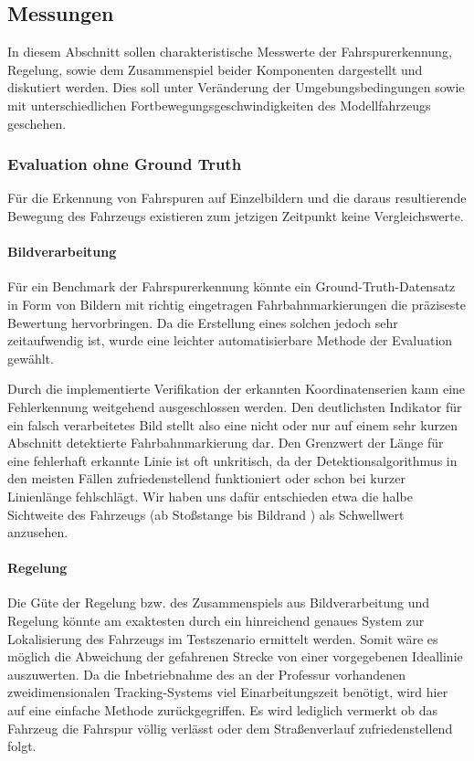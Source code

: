 \subsection{Messungen}
In diesem Abschnitt sollen charakteristische Messwerte der Fahrspurerkennung, Regelung, sowie dem Zusammenspiel beider Komponenten dargestellt und diskutiert werden. Dies soll unter Veränderung der Umgebungsbedingungen sowie mit unterschiedlichen Fortbewegungsgeschwindigkeiten des Modellfahrzeugs geschehen.
  
\subsubsection{Evaluation ohne Ground Truth}
Für die Erkennung von Fahrspuren auf Einzelbildern und die daraus resultierende Bewegung des Fahrzeugs existieren zum jetzigen Zeitpunkt keine Vergleichswerte. 

\paragraph{Bildverarbeitung} 
Für ein Benchmark der Fahrspurerkennung könnte ein Ground-Truth-Datensatz in Form von Bildern mit richtig eingetragen Fahrbahnmarkierungen die präziseste Bewertung hervorbringen. Da die Erstellung eines solchen jedoch sehr zeitaufwendig ist, wurde eine leichter automatisierbare Methode der Evaluation gewählt.

Durch die implementierte Verifikation der erkannten Koordinatenserien kann eine Fehlerkennung weitgehend ausgeschlossen werden. Den deutlichsten Indikator für ein falsch verarbeitetes Bild stellt also eine nicht oder nur auf einem sehr kurzen Abschnitt detektierte Fahrbahnmarkierung dar. Den Grenzwert der Länge für eine fehlerhaft erkannte Linie ist oft unkritisch, da der Detektionsalgorithmus in den meisten Fällen zufriedenstellend funktioniert oder schon bei kurzer Linienlänge fehlschlägt. Wir haben uns dafür entschieden etwa die halbe Sichtweite des Fahrzeugs (ab Stoßstange bis Bildrand ) als Schwellwert anzusehen.

\paragraph{Regelung} 
Die Güte der Regelung bzw. des Zusammenspiels aus Bildverarbeitung und Regelung könnte am exaktesten durch ein hinreichend genaues System zur Lokalisierung des Fahrzeugs im Testszenario ermittelt werden. Somit wäre es möglich die Abweichung der gefahrenen Strecke von einer vorgegebenen Ideallinie auszuwerten. Da die Inbetriebnahme des an der Professur vorhandenen zweidimensionalen Tracking-Systems viel Einarbeitungszeit benötigt, wird hier auf eine einfache Methode zurückgegriffen. Es wird lediglich vermerkt ob das Fahrzeug die Fahrspur völlig verlässt oder dem Straßenverlauf zufriedenstellend folgt.

